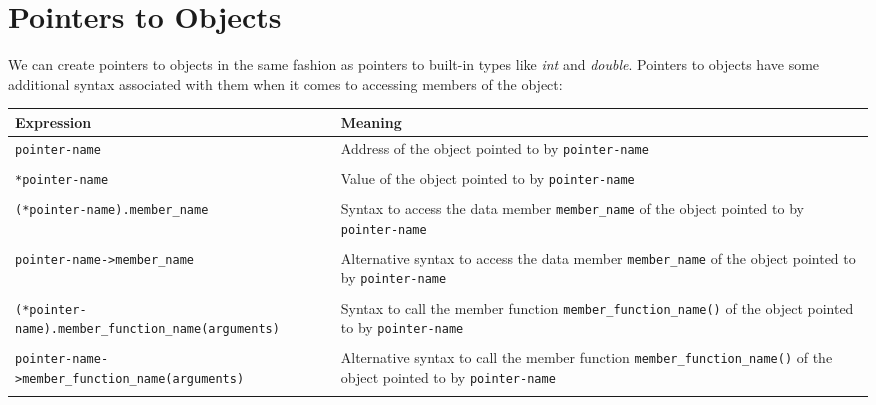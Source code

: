 \documentclass{report}
\begin{document}
\section{Pointers to Objects}
We can create pointers to objects in the same fashion as pointers to built-in types like \textit{int} and \textit{double}. Pointers to objects have some additional syntax associated with them when it comes to accessing members of the object:
\bigbreak \noindent
\begin{tabularx}{\textwidth}{@{}lX@{}}
\toprule
\textbf{Expression} & \textbf{Meaning} \\
\midrule
\texttt{pointer-name} & Address of the object pointed to by \texttt{pointer-name} \\ \\
\texttt{*pointer-name} & Value of the object pointed to by \texttt{pointer-name} \\ \\ 
\texttt{(*pointer-name).member\_name} & Syntax to access the data member \texttt{member\_name} of the object pointed to by \texttt{pointer-name} \\ \\
\texttt{pointer-name->member\_name} & Alternative syntax to access the data member \texttt{member\_name} of the object pointed to by \texttt{pointer-name} \\ \\
\texttt{(*pointer-name).member\_function\_name(arguments)} & Syntax to call the member function \texttt{member\_function\_name()} of the object pointed to by \texttt{pointer-name} \\ \\
\texttt{pointer-name->member\_function\_name(arguments)} & Alternative syntax to call the member function \texttt{member\_function\_name()} of the object pointed to by \texttt{pointer-name} \\ \\ 
\bottomrule
\end{tabularx}
\end{document}
